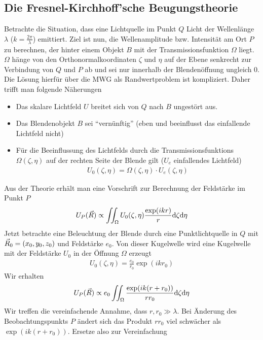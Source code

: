\subsection{Die Fresnel-Kirchhoff'sche Beugungstheorie}
Betrachte die Situation, dass eine Lichtquelle im Punkt $Q$ Licht der
Wellenlänge $\lambda$ ($k=\frac{2\pi}{\lambda}$) emittiert.
Ziel ist nun, die Wellenamplitude bzw. Intensität am Ort $P$ zu
berechnen, der hinter einem Objekt $B$ mit der Transmissionsfunktion
$\Omega$ liegt. $\Omega$ hänge von den Orthonormalkoordinaten $\zeta$
und $\eta$ auf der Ebene senkrecht zur Verbindung von $Q$ und $P$ ab
und sei nur innerhalb der Blendenöffnung ungleich 0.
Die Lösung hierfür über die MWG als Randwertproblem ist
kompliziert. Daher trifft man folgende Näherungen
\begin{itemize}
\item Das skalare Lichtfeld $U$ breitet sich von $Q$ nach $B$
  ungestört aus.
\item Das Blendenobjekt $B$ sei \enquote{vernünftig} (eben und
  beeinflusst das einfallende Lichtfeld nicht)
\item Für die Beeinflussung des Lichtfelds durch die
  Transmissionsfunktions $\Omega(\zeta,\eta)$ auf der rechten Seite der
  Blende gilt ($U_e$ einfallendes Lichtfeld)
  \begin{gather*}
    U_0(\zeta,\eta) = \Omega(\zeta,\eta)\cdot U_e(\zeta,\eta)
  \end{gather*}
\end{itemize}
Aus der Theorie erhält man eine Vorschrift zur Berechnung der
Feldstärke im Punkt $P$
\begin{gather*}
  U_P(\vec{R}) \propto \iint_{\Omega} 
  U_0(\zeta,\eta)\frac{\exp(ikr)}{r}\mathrm{d}\zeta\mathrm{d}\eta
\end{gather*}
Jetzt betrachte eine Beleuchtung der Blende durch eine
Punktlichtquelle in $Q$ mit $\vec{R}_0=(x_0,y_0,z_0)$ und Feldstärke
$e_0$.
Von dieser Kugelwelle wird eine Kugelwelle mit der Feldstärke $U_0$ in
der Öffnung $\Omega$ erzeugt
\begin{gather*}
  U_0(\zeta,\eta) = \frac{e_0}{r_0} \exp(ikr_0)
\end{gather*}
Wir erhalten
\begin{gather}
  U_P(\vec{R}) \propto e_0 \iint_{\Omega} 
  \frac{\exp(ik(r+r_0))}{rr_0}\mathrm{d}\zeta\mathrm{d}\eta
\end{gather}
Wir treffen die vereinfachende Annahme, dass $r, r_0\gg\lambda$.
Bei Änderung des Beobachtungspunkts $P$ ändert sich das Produkt $rr_0$
viel schwächer als $\exp(ik(r+r_0))$. Ersetze also zur Vereinfachung

